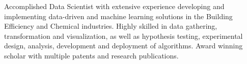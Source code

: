 

\begin{cvparagraph}

Accomplished Data Scientist with extensive experience developing and implementing data-driven and machine learning solutions in the Building Efficiency and Chemical industries. Highly skilled in data gathering, transformation and visualization, as well as hypothesis testing, experimental design, analysis, development and deployment of algorithms. Award winning scholar with multiple patents and research publications.

\end{cvparagraph}
